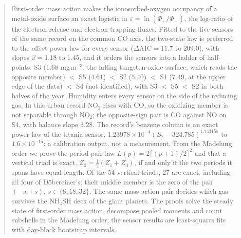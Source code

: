 \documentclass[11pt]{article}
\theoremstyle{definition}\newtheorem{definition}[theorem]{Definition}
\theoremstyle{remark}\newtheorem{remark}[theorem]{Remark}
\begin{document}
\begin{abstract}
First-order mass action makes the ionosorbed-oxygen occupancy of a metal-oxide surface an exact logistic in $\varepsilon=\ln(\Phi_+/\Phi_-)$, the log-ratio of the electron-release and electron-trapping fluxes. Fitted to the five sensors of the same record on the common CO axis, the two-state law is preferred to the offset power law for every sensor ($\Delta\mathrm{AIC}=11.7$ to $209.0$), with slopes $\beta=1.18$ to $1.45$, and it orders the sensors into a ladder of half-points: S3 ($1.68$ mg\,m$^{-3}$, the falling tungsten-oxide surface, which reads the opposite member) $<$ S5 ($4.61$) $<$ S2 ($5.40$) $<$ S1 ($7.49$, at the upper edge of the data) $<$ S4 (not identified), with S3 $<$ S5 $<$ S2 in both halves of the year. Humidity enters every sensor on the side of the reducing gas. In this urban record NO$_2$ rises with CO, so the oxidizing member is not separable through NO$_2$; the opposite-sign pair is CO against NO on S4, with balance slope $3.28$. The record's benzene column is an exact power law of the titania sensor, $1.23978\times10^{-4}(S_2-324.785)^{1.743158}$ to $1.6\times10^{-15}$: a calibration output, not a measurement. From the Madelung order we prove the period-pair law $L(p)=2\lceil(p+1)/2\rceil^2$ and that a vertical triad is exact, $Z_2=\frac12(Z_1+Z_3)$, if and only if the two periods it spans have equal length. Of the 54 vertical triads, 27 are exact, including all four of D\"obereiner's; their middle member is the zero of the pair $(-s,+s)$, $s\in\{8,18,32\}$. The same mass-action pair decides which gas survives the NH$_4$SH deck of the giant planets. The proofs solve the steady state of first-order mass action, decompose pooled moments and count subshells in the Madelung order; the sensor results are least-squares fits with day-block bootstrap intervals.
\end{abstract}
\end{document}

